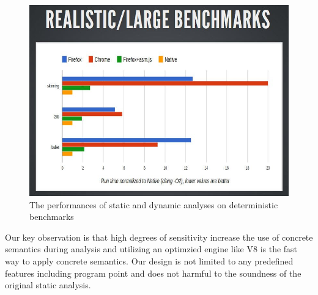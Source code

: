 \begin{figure}
  \centering
  \includegraphics[width=\linewidth]{img/benchmark_performance}
  \caption{The performances of static and dynamic analyses on deterministic benchmarks}
  \label{fig:performance}
\end{figure}

Our key observation is that high degrees of sensitivity increase the use of
concrete semantics during analysis and utilizing an optimzied engine like V8 is
the fast way to apply concrete semantics.
Our design is not limited to any predefined features including program point and
does not harmful to the soundness of the original static analysis.



